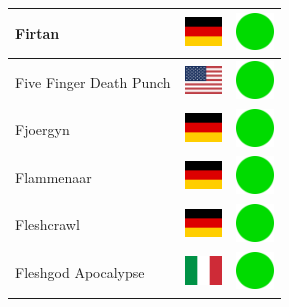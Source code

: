 \documentclass[12pt, a4paper, twoside]{report}
\begin{document}
\begin{center}
\begin{longtable}{|p{5cm}|p{2cm}|p{2cm}|}
 Firtan                                                     & \includegraphics[width=1cm]{../img/flags/de} &   \includegraphics[width=1cm]{../likes/y} \\ \hline
 Five Finger Death Punch                                    & \includegraphics[width=1cm]{../img/flags/us} &   \includegraphics[width=1cm]{../likes/y} \\ \hline
 Fjoergyn                                                   & \includegraphics[width=1cm]{../img/flags/de} &   \includegraphics[width=1cm]{../likes/y} \\ \hline
 Flammenaar                                                 & \includegraphics[width=1cm]{../img/flags/de} &   \includegraphics[width=1cm]{../likes/y} \\ \hline
 Fleshcrawl                                                 & \includegraphics[width=1cm]{../img/flags/de} &   \includegraphics[width=1cm]{../likes/y} \\ \hline
 Fleshgod Apocalypse                                        & \includegraphics[width=1cm]{../img/flags/it} &   \includegraphics[width=1cm]{../likes/y} \\ \hline

\end{longtable}
\end{center}
\end{document}
